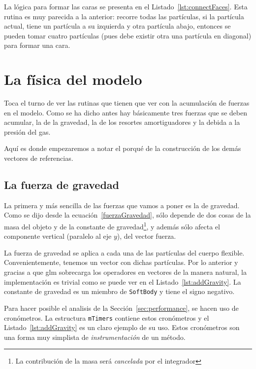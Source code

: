 La lógica para formar las caras se presenta en el Listado~\ref{lst:connectFaces}.
Esta rutina es muy parecida a la anterior: recorre todas las partículas, si la partícula actual, tiene un partícula a su izquierda y otra partícula abajo, entonces se pueden tomar cuatro partículas (pues debe existir otra una partícula en diagonal) para formar una cara.

\section{La física del modelo}
Toca el turno de ver las rutinas que tienen que ver con la acumulación de fuerzas en el modelo.
Como se ha dicho antes hay básicamente tres fuerzas que se deben acumular, la de la gravedad, la de los resortes amortiguadores y la debida a la presión del gas.

Aquí es donde empezaremos a notar el porqué de la construcción de los demás vectores de referencias.

\subsection{La fuerza de gravedad}
La primera y más sencilla de las fuerzas que vamos a poner es la de gravedad.
Como se dijo desde la ecuación~\eqref{fuerzaGravedad}, sólo depende de dos cosas de la masa del objeto y de la constante de gravedad\footnote{La contribución de la masa será \emph{cancelada} por el integrador}, y además sólo afecta el componente vertical (paralelo al eje $y$), del vector fuerza.

La fuerza de gravedad se aplica a cada una de las partículas del cuerpo flexible. 
Convenientemente, tenemos un vector con dichas partículas.
Por lo anterior y gracias a que glm sobrecarga los operadores en vectores de la manera natural, la implementación es trivial como se puede ver en el Listado~\ref{lst:addGravity}.
La constante de gravedad es un miembro de \texttt{SoftBody} y tiene el signo negativo.

Para hacer posible el analisis de la Sección~\ref{sec:performance}, se hacen uso de cronómetros. La estructura \texttt{mTimers} contiene estos cronómetros  y el Listado~\ref{lst:addGravity} es un claro ejemplo de su uso. Estos cronómetros son una forma muy simplista de \emph{instrumentación} de un método.


